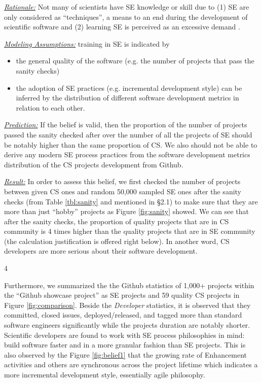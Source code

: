 \documentclass[sigconf,review,anonymous]{acmart}
\newcommand{\bi}{\begin{itemize}}
\newcommand{\ei}{\end{itemize}}
\begin{document}
\noindent \textit{\underline{Rationale:}} Not many of scientists have SE knowledge or skill due to (1) SE are only considered as ``techniques'', a means to an end during the development of scientific software \cite{sanders08_risk} and (2) learning SE is perceived as an excessive demand \cite{boyle09_lessons}. 

\noindent \textit{\underline{Modeling Assumptions:}} training in SE is indicated by
\bi
\item the general quality of the software (e.g. the number of projects that pass the sanity checks)  
\item the adoption of SE practices (e.g. incremental development style) can be inferred by the distribution of different software development metrics in relation to each other.  
\ei

\noindent \textit{\underline{Prediction:}} If the belief is valid, then the proportion of the number of projects passed the sanity checked after over the number of all the projects of SE should be notably higher than the same proportion of CS. We also should not be able to derive any modern SE process practices from the software development metrics distribution of the CS projects development from Github. 

\noindent \textit{\underline{Result:}} In order to assess this belief, we first checked the number of projects between given CS ones and random 50,000 sampled SE ones after the sanity checks (from Table \ref{tbl:sanity} and mentioned in \S2.1) to make sure that they are more than just ``hobby'' projects as Figure \ref{fig:sanity} showed. We can see that after the sanity checks, the proportion of quality projects that are in CS community is 4  times higher than the quality projects that are in SE community (the calculation justification is offered right below). In another word, CS developers are more serious about their software development.  

\hspace{-10pt}  4  

Furthermore, we summarized the the Github statistics of 1,000+ projects within the ``Github showcase project'' as SE projects and 59 quality CS projects in Figure \ref{fig:comparison}. Beside the \textit{Developer} statistics, it is observed that they committed, closed issues, deployed/released, and tagged more than standard software engineers significantly while the projects duration are notably shorter. Scientific developers are found to work with SE process philosophies in mind: build software faster and in a more granular fashion than SE projects. This is also observed by the Figure \ref{fig:belief1} that the growing rate of Enhancement activities and others are synchronous across the project lifetime which indicates a more incremental development style, essentially agile philosophy.  
\end{document}
